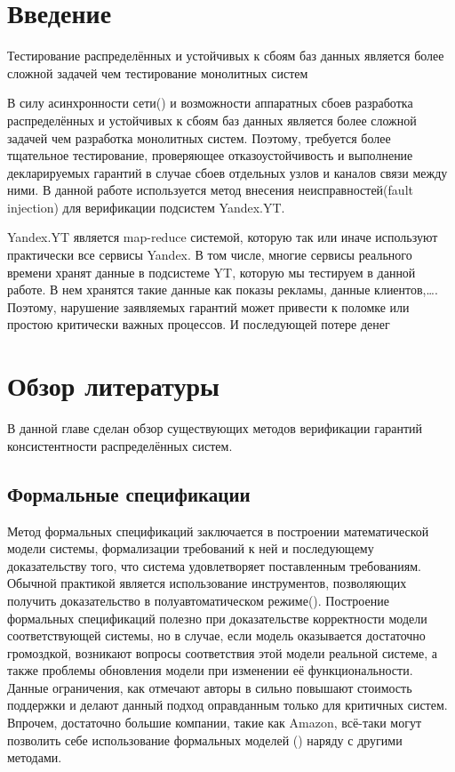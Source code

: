 \documentclass[pdftex,ptm,14pt,a4paper]{extreport}
\theoremstyle{definition}
\begin{document}
\tableofcontents

\sloppy

\chapter{Введение}
Тестирование распределённых и устойчивых к сбоям баз данных является более сложной задачей чем тестирование монолитных систем

В силу асинхронности сети(\cite{network-reliable}) и возможности аппаратных сбоев разработка распределённых и устойчивых к сбоям
баз данных является более сложной задачей чем разработка монолитных систем. Поэтому, требуется более тщательное тестирование,
проверяющее отказоустойчивость и выполнение декларируемых гарантий в случае сбоев отдельных узлов и каналов связи между ними.
В данной работе используется метод внесения неисправностей(fault injection) для верификации подсистем Yandex.YT.

Yandex.YT является map-reduce системой, которую так или иначе используют практически все сервисы Yandex.
В том числе, многие сервисы реального времени хранят данные в подсистеме YT, которую мы тестируем в данной работе.
В нем хранятся такие данные как показы рекламы, данные клиентов,\dots. Поэтому, нарушение заявляемых гарантий может
привести к поломке или простою критически важных процессов. И последующей потере денег

\chapter{Обзор литературы}
В данной главе сделан обзор существующих методов
верификации гарантий консистентности распределённых систем.

\section{Формальные спецификации}
Метод формальных спецификаций заключается в построении математической модели системы, формализации требований к ней и последующему
доказательству того, что система удовлетворяет поставленным требованиям. Обычной практикой является использование инструментов, позволяющих получить доказательство в полуавтоматическом режиме(\cite{coq}).
Построение формальных спецификаций полезно при доказательстве корректности модели соответствующей
системы, но  в случае, если модель оказывается достаточно громоздкой, возникают вопросы
соответствия этой модели реальной системе, а также проблемы обновления модели при изменении её функциональности.
Данные ограничения, как отмечают авторы в \cite{models-bounds} сильно повышают стоимость поддержки
и делают данный подход оправданным только для критичных систем.
Впрочем, достаточно большие компании, такие как Amazon, всё-таки могут позволить себе использование формальных моделей
(\cite{amazon-formal-proofs}) наряду с другими методами.
\end{document}
